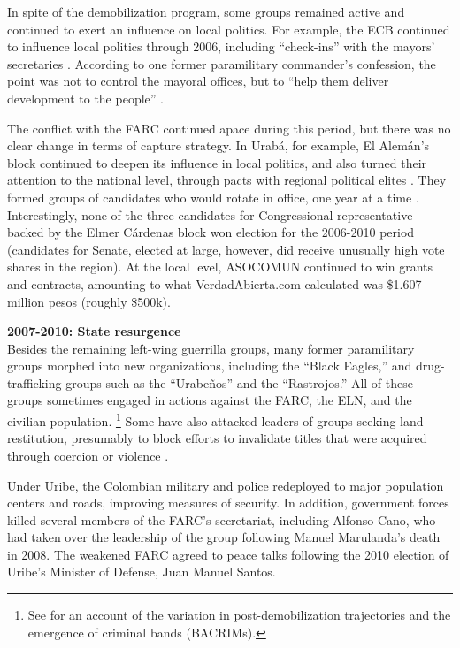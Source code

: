 In spite of the demobilization program, some groups remained active and continued to exert an influence on local politics. For example, the ECB continued to influence local politics through 2006, including ``check-ins'' with the mayors' secretaries \citep{verdad-abierta11a}. According to one former paramilitary commander's confession, the point was not to control the mayoral offices, but to ``help them deliver development to the people'' \citep{verdad-abierta11a}.  

The conflict with the FARC continued apace during this period, but there was no clear change in terms of capture strategy. In Urab\'{a}, for example, El Alem\'{a}n's block continued to deepen its influence in local politics, and also turned their attention to the national level, through pacts with regional political elites \citep{gutierrez-sanin10c, lopez-hernandez10a}. They formed groups of candidates who would rotate in office, one year at a time \citep{verdad-abierta11a}. Interestingly, none of the three candidates for Congressional representative backed by the Elmer C\'{a}rdenas block won election for the 2006-2010 period (candidates for Senate, elected at large, however, did receive unusually high vote shares in the region). At the local level, ASOCOMUN continued to win grants and contracts, amounting to what VerdadAbierta.com calculated was \$1.607 million pesos (roughly \$500k).

\textbf{2007-2010: State resurgence}\\
Besides the remaining left-wing guerrilla groups, many former paramilitary groups morphed into new organizations, including the ``Black Eagles,'' and drug-trafficking groups such as the ``Urabe\~{n}os'' and the ``Rastrojos.'' All of these groups sometimes engaged in actions against the FARC, the ELN, and the civilian population. \footnote{See \citet{daly16a} for an account of the variation in post-demobilization trajectories and the emergence of criminal bands (BACRIMs).} Some have also attacked leaders of groups seeking land restitution, presumably to block efforts to invalidate titles that were acquired through coercion or violence \citep{amnesty-international14a}. 

Under Uribe, the Colombian military and police redeployed to major population centers and roads, improving measures of security. In addition, government forces killed several members of the FARC's secretariat, including Alfonso Cano, who had taken over the leadership of the group following Manuel Marulanda's death in 2008. The weakened FARC agreed to peace talks following the 2010 election of Uribe's Minister of Defense, Juan Manuel Santos. 




